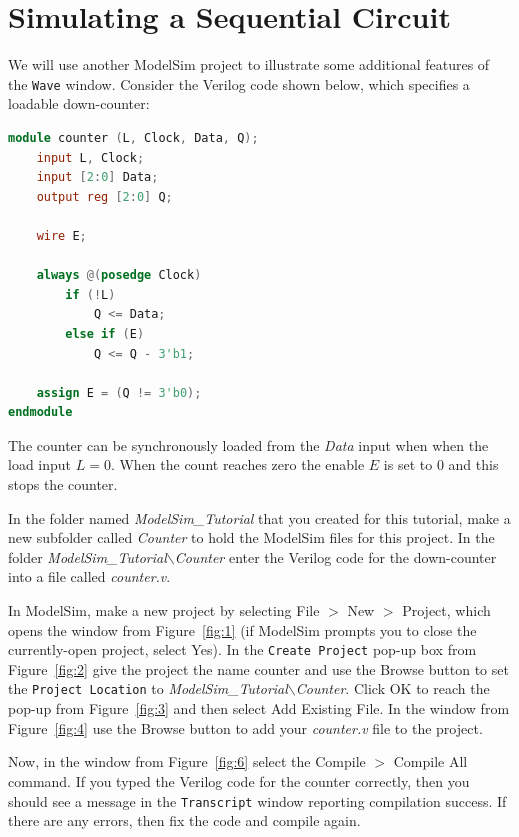 \documentclass[11pt, twoside, pdftex]{article}
\begin{document}
\section{Simulating a Sequential Circuit}

We will use another ModelSim project to illustrate some additional features
of the \texttt{Wave} window.  Consider the Verilog code shown below, which 
specifies a loadable down-counter:
~\\
\begin{lstlisting}[language=Verilog]
module counter (L, Clock, Data, Q);
    input L, Clock;
    input [2:0] Data;
    output reg [2:0] Q;

    wire E; 

    always @(posedge Clock)
        if (!L)
            Q <= Data;
        else if (E)
            Q <= Q - 3'b1;

    assign E = (Q != 3'b0);
endmodule
\end{lstlisting}

The counter can be synchronously loaded from the {\it Data} input when when the load input
$L = 0$. When the count reaches zero the enable $E$ is set to 0 and this stops the counter. 

In the folder named {\it ModelSim\_Tutorial} that you created for this tutorial, make a new
subfolder called {\it Counter} to hold the ModelSim files for this project.
In the folder {\it ModelSim\_Tutorial$\backslash$Counter}
enter the Verilog code for the down-counter into a file called {\it counter.v}.

In ModelSim, make a new project by selecting {\sf File $>$ New $>$ Project}, which opens the window 
from Figure~\ref{fig:1} (if ModelSim prompts you to close the currently-open project, select {\sf Yes}). 
In the \texttt{Create Project} pop-up box from Figure~\ref{fig:2} give the project the name 
{\sf counter} and use the {\sf Browse} button to set the \texttt{Project Location} to
{\it ModelSim\_Tutorial$\backslash$Counter}. Click {\sf OK} to reach the pop-up from 
Figure~\ref{fig:3} and then select {\sf Add Existing File}. In the window from 
Figure~\ref{fig:4} use the {\sf Browse} button to add your {\it counter.v} file to the project. 

Now, in the window from Figure~\ref{fig:6} select the {\sf Compile $>$ Compile All} command.
If you typed the Verilog code for the counter correctly, then you should see a message in the
\texttt{Transcript} window reporting compilation success. If there are any errors, then fix the code
and compile again.
\end{document}
